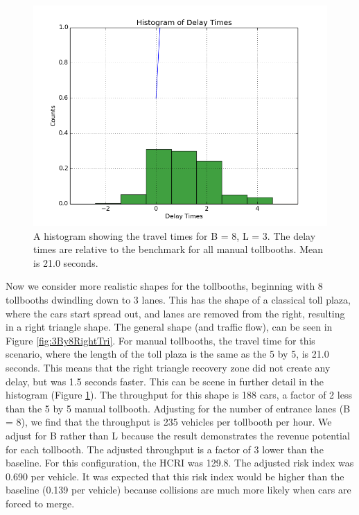 \documentclass[a4paper, 11pt]{article}
\begin{document}
\begin{figure}[H]
\begin{center}
\includegraphics[scale=0.3]{Images/hist_3_8.png}
\caption{A histogram showing the travel times for B = 8, L = 3. The delay times are relative to the benchmark for all manual tollbooths. Mean is 21.0 seconds.}
\label{fig:manual38}
\end{center}
\end{figure}


Now we consider more realistic shapes for the tollbooths, beginning with 8 tollbooths dwindling down to 3 lanes. 
This has the shape of a classical toll plaza, where the cars start spread out, and lanes are removed from the right, resulting in a right triangle shape. 
The general shape (and traffic flow), can be seen in Figure \ref{fig:3By8RightTri}. For manual tollbooths, the travel time for this scenario, where the length of the toll plaza is the same as the 5 by 5, is 21.0 seconds. This means that the right triangle recovery zone did not create any delay, but was 1.5 seconds faster. 
This can be scene in further detail in the histogram (Figure \ref{fig:manual38}). The throughput for this shape is 188 cars, a factor of 2 less than the 5 by 5 manual tollbooth. Adjusting for the number of entrance lanes (B = 8), we find that the throughput is 235 vehicles per tollbooth per hour. We adjust for B rather than L because the result demonstrates the revenue potential for each tollbooth. The adjusted throughput is a factor of 3 lower than the baseline. For this configuration, the HCRI was 129.8. The adjusted risk index was 0.690 per vehicle. It was expected that this risk index would be higher than the baseline (0.139 per vehicle) because collisions are much more likely when cars are forced to merge. 
\end{document}
